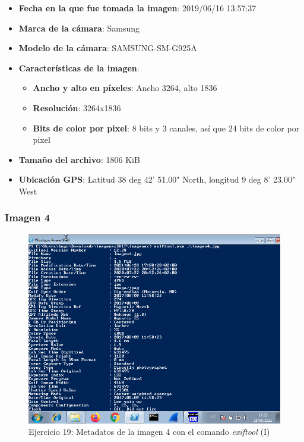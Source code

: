\documentclass[11pt]{article}
\begin{document}
\begin{itemize}
    \item \textbf{Fecha en la que fue tomada la imagen}: 2019/06/16 13:57:37
    \item \textbf{Marca de la cámara}: Samsung
    \item \textbf{Modelo de la cámara}: SAMSUNG-SM-G925A
    \item \textbf{Características de la imagen}:
        \begin{itemize}
            \item \textbf{Ancho y alto en píxeles}: Ancho 3264, alto 1836
            \item \textbf{Resolución}: 3264x1836
            \item \textbf{Bits de color por pixel}: 8 bits y 3 canales, así que 24 bits de color por pixel
        \end{itemize}
    \item \textbf{Tamaño del archivo}: 1806 KiB
    \item \textbf{Ubicación GPS}: Latitud 38 deg 42' 51.00" North, longitud 9 deg 8' 23.00" West
\end{itemize}

\subsubsection{Imagen 4}

\begin{figure}[H]
    \caption{Ejercicio 19: Metadatos de la imagen 4 con el comando \textit{exiftool} (I)}
    \centering
    \includegraphics[scale=0.7]{p03/e19-9.png}
\end{figure}
\end{document}
